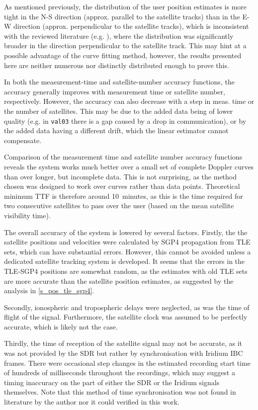 As mentioned previously, the distribution of the user position estimates is more tight in the N-S direction (approx. parallel to the satellite tracks) than in the E-W direction (approx. perpendicular to the satellite tracks), which is inconsistent with the reviewed literature (e.g. \cite{sop10, sop12}), where the distribution was significantly broader in the direction perpendicular to the satellite track. This may hint at a possible advantage of the curve fitting method, however, the results presented here are neither numerous nor distinctly distributed enough to prove this.

In both the measurement-time and satellite-number accuracy functions, the accuracy generally improves with measurement time or satellite number, respectively. However, the accuracy can also decrease with a step in meas. time or the number of satellites. This may be due to the added data being of lower quality (e.g. in \texttt{val03} there is a gap caused by a drop in communication), or by the added data having a different drift, which the linear estimator cannot compensate.

Comparison of the measurement time and satellite number accuracy functions reveals the system works much better over a small set of complete Doppler curves than over longer, but incomplete data. This is not surprising, as the method chosen was designed to work over curves rather than data points. Theoretical minimum TTF is therefore around \qty{10}{minutes}, as this is the time required for two consecutive satellites to pass over the user (based on the mean satellite visibility time).

The overall accuracy of the system is lowered by several factors. Firstly, the the satellite positions and velocities were calculated by SGP4 propagation from TLE sets, which can have substantial errors. However, this cannot be avoided unless a dedicated satellite tracking system is developed. It seems that the errors in the TLE-SGP4 positions are somewhat random, as the estimates with old TLE sets are more accurate than the satellite position estimates, as suggested by the analysis in \autoref{s_pos_tle_sgp4}.

Secondly, ionospheric and tropospheric delays were neglected, as was the time of flight of the signal. Furthermore, the satellite clock was assumed to be perfectly accurate, which is likely not the case.

Thirdly, the time of reception of the satellite signal may not be accurate, as it was not provided by the SDR but rather by synchronisation with Iridium IBC frames. There were occasional step changes in the estimated recording start time of hundreds of milliseconds throughout the recordings, which may suggest a timing inaccuracy on the part of either the SDR or the Iridium signals themselves. Note that this method of time synchronisation was not found in literature by the author nor it could verified in this work.

